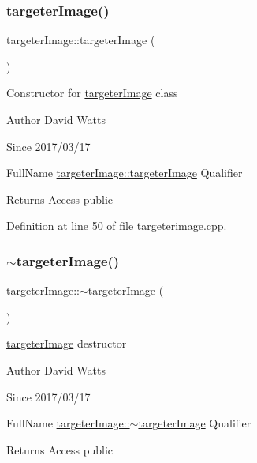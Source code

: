\subsubsection{\texorpdfstring{targeter\+Image()}{targeterImage()}\hspace{0.1cm}{\footnotesize\ttfamily [2/2]}}
{\footnotesize\ttfamily targeter\+Image\+::targeter\+Image (\begin{DoxyParamCaption}{ }\end{DoxyParamCaption})}

Constructor for \hyperlink{classtargeter_image}{targeter\+Image} class

\begin{DoxyAuthor}{Author}
David Watts 
\end{DoxyAuthor}
\begin{DoxySince}{Since}
2017/03/17
\end{DoxySince}
Full\+Name \hyperlink{classtargeter_image_a2a82f686b73602837e2fb304ce37861d}{targeter\+Image\+::targeter\+Image} Qualifier \begin{DoxyReturn}{Returns}
Access public 
\end{DoxyReturn}


Definition at line 50 of file targeterimage.\+cpp.

\mbox{\label{classtargeter_image_a885fd05e144dff445373442278e96c1b}} 
\subsubsection{\texorpdfstring{$\sim$targeter\+Image()}{~targeterImage()}}
{\footnotesize\ttfamily targeter\+Image\+::$\sim$targeter\+Image (\begin{DoxyParamCaption}{ }\end{DoxyParamCaption})}

\hyperlink{classtargeter_image}{targeter\+Image} destructor

\begin{DoxyAuthor}{Author}
David Watts 
\end{DoxyAuthor}
\begin{DoxySince}{Since}
2017/03/17
\end{DoxySince}
Full\+Name \hyperlink{classtargeter_image_a885fd05e144dff445373442278e96c1b}{targeter\+Image\+::$\sim$targeter\+Image} Qualifier \begin{DoxyReturn}{Returns}
Access public 
\end{DoxyReturn}


